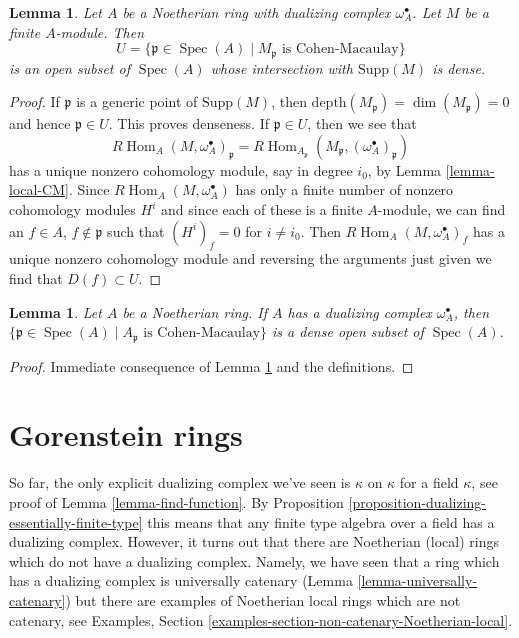 \documentclass{stacks-project}
\theoremstyle{plain}
\newtheorem{lemma}[subsection]{Lemma}
\theoremstyle{definition}
\theoremstyle{remark}
\numberwithin{equation}{subsection}
\def\Spec{\mathop{\mathrm{Spec}}}
\def\Hom{\mathop{\mathrm{Hom}}\nolimits}
\begin{document}
\begin{lemma}
\label{lemma-CM-open}
Let $A$ be a Noetherian ring with dualizing complex $\omega_A^\bullet$.
Let $M$ be a finite $A$-module. Then
$$
U = \{\mathfrak p \in \Spec(A) \mid M_\mathfrak p\text{ is Cohen-Macaulay}\}
$$
is an open subset of $\Spec(A)$ whose intersection with
$\text{Supp}(M)$ is dense.
\end{lemma}

\begin{proof}
If $\mathfrak p$ is a generic point of $\text{Supp}(M)$, then
$\text{depth}(M_\mathfrak p) = \dim(M_\mathfrak p) = 0$
and hence $\mathfrak p \in U$. This proves denseness.
If $\mathfrak p \in U$, then we see that
$$
R\Hom_A(M, \omega_A^\bullet)_\mathfrak p =
R\Hom_{A_\mathfrak p}(M_\mathfrak p, (\omega_A^\bullet)_\mathfrak p)
$$
has a unique nonzero cohomology module, say in degree $i_0$, by
Lemma \ref{lemma-local-CM}.
Since $R\Hom_A(M, \omega_A^\bullet)$
has only a finite number of nonzero cohomology modules $H^i$
and since each of these is a finite $A$-module, we can
find an $f \in A$, $f \not \in \mathfrak p$ such that
$(H^i)_f = 0$ for $i \not = i_0$. Then
$R\Hom_A(M, \omega_A^\bullet)_f$ has a unique nonzero cohomology
module and reversing the arguments just given we find
that $D(f) \subset U$.
\end{proof}

\begin{lemma}
\label{lemma-CM}
Let $A$ be a Noetherian ring. If $A$ has a dualizing complex
$\omega_A^\bullet$, then
$\{\mathfrak p \in \Spec(A) \mid A_\mathfrak p\text{ is Cohen-Macaulay}\}$
is a dense open subset of $\Spec(A)$.
\end{lemma}

\begin{proof}
Immediate consequence of Lemma \ref{lemma-CM-open} and the definitions.
\end{proof}






\section{Gorenstein rings}
\label{section-gorenstein}

\noindent
So far, the only explicit dualizing complex we've seen is $\kappa$ on $\kappa$
for a field $\kappa$, see proof of Lemma \ref{lemma-find-function}.
By Proposition \ref{proposition-dualizing-essentially-finite-type}
this means that any finite type algebra over a field has a dualizing
complex. However, it turns out that there are Noetherian (local) rings
which do not have a dualizing complex. Namely, we have seen that
a ring which has a dualizing complex is universally catenary
(Lemma \ref{lemma-universally-catenary})
but there are examples of
Noetherian local rings which are not catenary, see
Examples, Section \ref{examples-section-non-catenary-Noetherian-local}.
\end{document}
